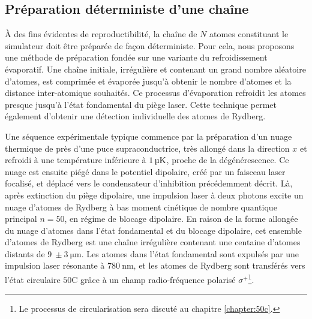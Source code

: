 	\subsection{Préparation déterministe d'une chaîne}\label{subsec:vdW_evap}
\noindent À des fins évidentes de reproductibilité, la chaîne de $N$ atomes constituant le simulateur doit être préparée de façon déterministe.
Pour cela, nous proposons une méthode de préparation fondée sur une variante du refroidissement évaporatif.
Une chaîne initiale, irrégulière et contenant un grand nombre aléatoire d'atomes, est comprimée et \og évaporée \fg{} jusqu'à obtenir le nombre d'atomes et la distance inter-atomique souhaités.
Ce processus d'évaporation refroidit les atomes presque jusqu'à l'état fondamental du piège laser.
Cette technique permet également d'obtenir une détection individuelle des atomes de Rydberg.

Une séquence expérimentale typique commence par la préparation d'un nuage thermique de  près d'une puce supraconductrice, très allongé dans la direction $x$ et refroidi à une température inférieure à $\SI{1}{\si{\micro\kelvin}}$, proche de la dégénérescence.
Ce nuage est ensuite piégé dans le potentiel dipolaire, créé par un faisceau laser focalisé, et déplacé vers le condensateur d'inhibition précédemment décrit.
Là, après extinction du piège dipolaire, une impulsion laser à deux photons excite un nuage d'atomes de Rydberg à bas moment cinétique de nombre quantique principal $n=50$, en régime de blocage dipolaire.
En raison de la forme allongée du nuage d'atomes dans l'état fondamental et du blocage dipolaire, cet ensemble d'atomes de Rydberg est une chaîne irrégulière contenant une centaine d'atomes distants de $\SI{9}{}\pm\SI{3}{\um}$.
Les atomes dans l'état fondamental sont expulsés par une impulsion laser résonante à $\SI{780}{\nano\meter}$, et les atomes de Rydberg sont transférés vers l'état circulaire $\mathrm{50C}$ grâce à un champ radio-fréquence polarisé $\sigma^+$\footnote{Le processus de circularisation sera discuté au chapitre \ref{chapter:50c}.}.

